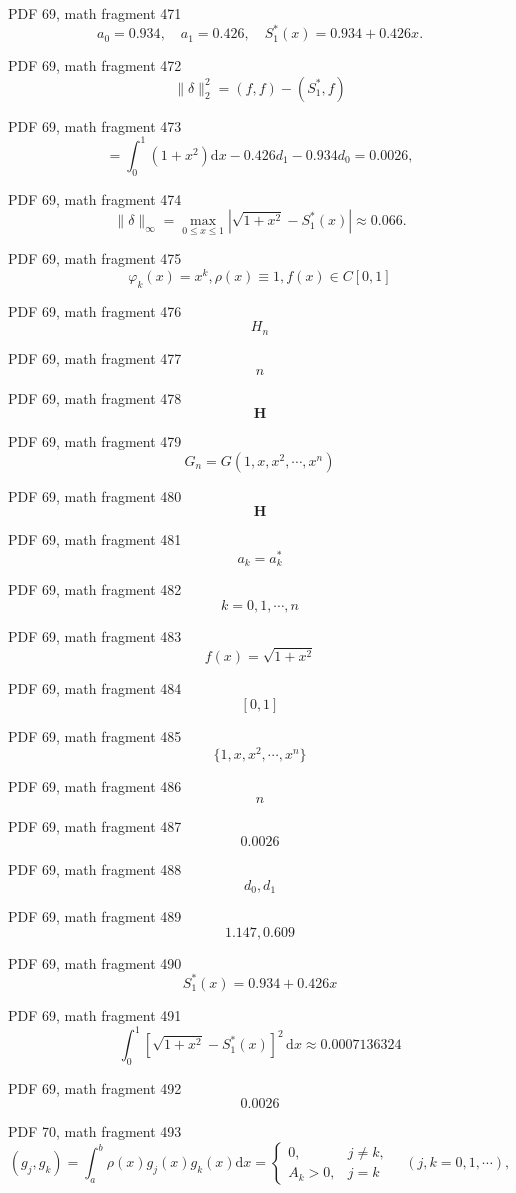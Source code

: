 \documentclass[UTF8,fontset=fandol]{ctexart}
\begin{document}
\par
PDF 69, math fragment 471
\[
a_0 = 0.934, \quad a_1 = 0.426, \quad S_1^*(x) = 0.934 + 0.426x.
\]
\par
PDF 69, math fragment 472
\[
\|\delta\|_2^2 = (f, f) - (S_1^*, f)
\]
\par
PDF 69, math fragment 473
\[
= \int_0^1 (1+x^2) \mathrm{d}x - 0.426 d_1 - 0.934 d_0 = 0.0026,
\]
\par
PDF 69, math fragment 474
\[
\|\delta\|_\infty = \max_{0 \leqslant x \leqslant 1} |\sqrt{1+x^2} - S_1^*(x)| \approx 0.066.
\]
\par
PDF 69, math fragment 475
\[\varphi_k(x) = x^k, \rho(x) \equiv 1, f(x) \in C[0,1]\]
\par
PDF 69, math fragment 476
\[H_n\]
\par
PDF 69, math fragment 477
\[n\]
\par
PDF 69, math fragment 478
\[\boldsymbol{H}\]
\par
PDF 69, math fragment 479
\[G_n = G(1, x, x^2, \cdots, x^n)\]
\par
PDF 69, math fragment 480
\[\boldsymbol{H}\]
\par
PDF 69, math fragment 481
\[a_k = a_k^*\]
\par
PDF 69, math fragment 482
\[k=0, 1, \cdots, n\]
\par
PDF 69, math fragment 483
\[f(x) = \sqrt{1+x^2}\]
\par
PDF 69, math fragment 484
\[[0,1]\]
\par
PDF 69, math fragment 485
\[\{1, x, x^2, \cdots, x^n\}\]
\par
PDF 69, math fragment 486
\[n\]
\par
PDF 69, math fragment 487
\[0.0026\]
\par
PDF 69, math fragment 488
\[d_0,d_1\]
\par
PDF 69, math fragment 489
\[1.147,0.609\]
\par
PDF 69, math fragment 490
\[S_1^*(x)=0.934+0.426x\]
\par
PDF 69, math fragment 491
\[\int_0^1[\sqrt{1+x^2}-S_1^*(x)]^2\,\mathrm{d}x\approx0.0007136324\]
\par
PDF 69, math fragment 492
\[0.0026\]
\par
PDF 70, math fragment 493
\[
(g_j, g_k) = \int_a^b \rho(x) g_j(x) g_k(x) \mathrm{d}x = \begin{cases} 0, & j \neq k, \\ A_k > 0, & j = k \end{cases} \quad (j, k = 0, 1, \cdots),
\]
\par
\end{document}
